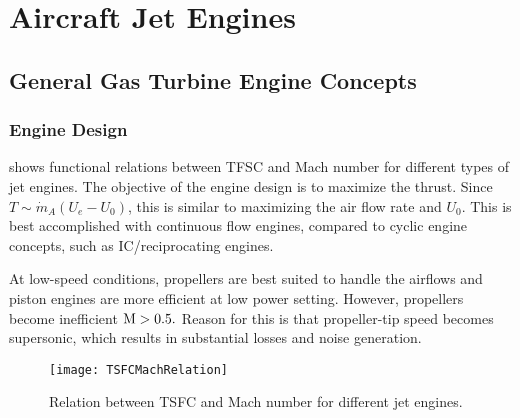 \section{Aircraft Jet Engines}

\subsection{General Gas Turbine Engine Concepts}

\subsubsection{Engine Design}
 shows functional relations between TFSC and Mach number for different types of jet engines. The objective of the engine design is to maximize the thrust. Since $T \sim \dot{m}_A(U_e - U_0)$, this is similar to maximizing the air flow rate and $U_0$. This is best accomplished with continuous flow engines, compared to cyclic engine concepts, such as IC/reciprocating engines.

At low-speed conditions, propellers are best suited to handle the airflows and piston engines are more efficient at low power setting. However, propellers become inefficient ${\rm{M}} > 0.5.$ Reason for this is that propeller-tip speed becomes supersonic, which results in substantial losses and noise generation. 

\begin{figure}[!htb!]
 \centering
    {\texttt{[image: TSFCMachRelation]}}
    \caption{\label{FIG_TSFC_MACH}Relation between TSFC and Mach number for different jet engines.}
\end{figure}

